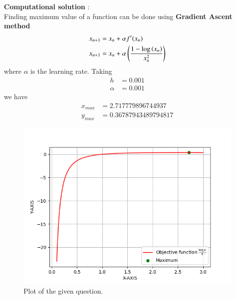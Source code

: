 \documentclass[journal]{IEEEtran}
\begin{document}
\textbf{Computational solution} : \\

Finding maximum value of a function can be done using \textbf{Gradient Ascent method} \\
\begin{align}
	x_{n+1} &= x_{n} + \alpha f^{\prime} (x_{n}) \\
	x_{n+1} &= x_{n} + \alpha \left(\frac{1 - \log \left(x_{n}\right)}{x_{n}^2}\right) \\
\end{align}
where $\alpha$ is the learning rate.
Taking
\begin{align}
	h &= 0.001 \\
	\alpha &= 0.001
\end{align}
we have
\begin{align}
	x_{max} &= 2.717779896744937 \\
	y_{max} &= 0.36787943489794817
\end{align}

\begin{figure}[h]
\centering
\includegraphics[width=\columnwidth]{figs/fig.png}
\caption{Plot of the given question.}
\label{fig:Plot1} 
\end{figure}
\end{document}
